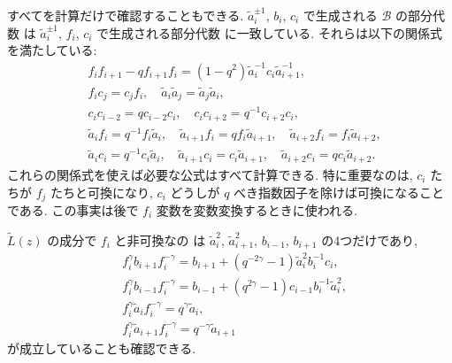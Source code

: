 \documentclass[12pt,twoside,dvipdfm]{msjproc}
\theoremstyle{definition} %
\theoremstyle{definition} %
\theoremstyle{definition} %
\numberwithin{theorem}{section}
\numberwithin{equation}{section}
\numberwithin{figure}{section}
\numberwithin{table}{section}
\newcommand\B{\mathcal{B}}
\newcommand\tL{{\widetilde{L}}}
\newcommand\ta{{\tilde{a}}}
\begin{document}
すべてを計算だけで確認することもできる. 
$\ta_i^{\pm 1}$, $b_i$, $c_i$ で生成される $\B$ の部分代数
は $\ta_i^{\pm 1}$, $f_i$, $c_i$ で生成される部分代数
に一致している. それらは以下の関係式を満たしている:
\begin{align*}
 &
 f_i f_{i+1} - q f_{i+1} f_i = (1-q^2) \ta_i^{-1}c_i\ta_{i+1}^{-1}, 
 \\ &
 f_i c_j = c_j f_i, \quad
 \ta_i\ta_j = \ta_j\ta_i, 
 \\ &
 c_i c_{i-2} = q c_{i-2} c_i, \quad
 c_i c_{i+2} = q^{-1} c_{i+2} c_i, 
 \\ &
 \ta_i     f_i = q^{-1} f_i \ta_i, \quad
 \ta_{i+1} f_i = q      f_i \ta_{i+1}, \quad
 \ta_{i+2} f_i = f_i\ta_{i+2}, 
 \\ &
 \ta_i     c_i = q^{-1} c_i \ta_i, \quad
 \ta_{i+1} c_i =        c_i \ta_{i+1}, \quad
 \ta_{i+2} c_i = q      c_i \ta_{i+2}.
\end{align*}
これらの関係式を使えば必要な公式はすべて計算できる.
特に重要なのは, $c_i$ たちが $f_j$ たちと可換になり, 
$c_i$ どうしが $q$ べき指数因子を除けば可換になることである.
この事実は後で $f_i$ 変数を変数変換するときに使われる.

$\tL(z)$ の成分で $f_i$ と非可換なの
は $\ta_i^2$, $\ta_{i+1}^2$, $b_{i-1}$, $b_{i+1}$ の4つだけであり, 
\begin{align*}
 &
 f_i^\gamma b_{i+1} f_i^{-\gamma}
 = b_{i+1} + (q^{-2\gamma}-1)\ta_i^2 b_i^{-1} c_i,
 \\ &
 f_i^\gamma b_{i-1} f_i^{-\gamma}
 = b_{i-1} + (q^{2\gamma}-1)c_{i-1}b_i^{-1}\ta_i^2,
 \\ &
 f_i^\gamma \ta_i f_i^{-\gamma} = q^\gamma \ta_i, 
 \\ &
 f_i^\gamma \ta_{i+1} f_i^{-\gamma} = q^{-\gamma} \ta_{i+1} 
\end{align*}
が成立していることも確認できる.
\end{document}
